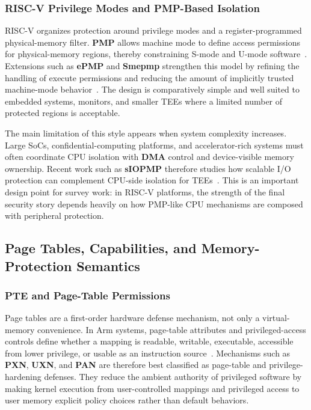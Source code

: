 \subsubsection{RISC-V Privilege Modes and PMP-Based Isolation}

RISC-V organizes protection around privilege modes and a register-programmed physical-memory filter. \textbf{PMP} allows machine mode to define access permissions for physical-memory regions, thereby constraining S-mode and U-mode software~\cite{riscv_privileged}. Extensions such as \textbf{ePMP} and \textbf{Smepmp} strengthen this model by refining the handling of execute permissions and reducing the amount of implicitly trusted machine-mode behavior~\cite{riscv_privileged}. The design is comparatively simple and well suited to embedded systems, monitors, and smaller TEEs where a limited number of protected regions is acceptable.

The main limitation of this style appears when system complexity increases. Large SoCs, confidential-computing platforms, and accelerator-rich systems must often coordinate CPU isolation with \textbf{DMA} control and device-visible memory ownership. Recent work such as \textbf{sIOPMP} therefore studies how scalable I/O protection can complement CPU-side isolation for TEEs~\cite{feng2024siopmp}. This is an important design point for survey work: in RISC-V platforms, the strength of the final security story depends heavily on how PMP-like CPU mechanisms are composed with peripheral protection.

\subsection{Page Tables, Capabilities, and Memory-Protection Semantics}

\subsubsection{PTE and Page-Table Permissions}

Page tables are a first-order hardware defense mechanism, not only a virtual-memory convenience. In Arm systems, page-table attributes and privileged-access controls define whether a mapping is readable, writable, executable, accessible from lower privilege, or usable as an instruction source~\cite{armv-a}. Mechanisms such as \textbf{PXN}, \textbf{UXN}, and \textbf{PAN} are therefore best classified as page-table and privilege-hardening defenses. They reduce the ambient authority of privileged software by making kernel execution from user-controlled mappings and privileged access to user memory explicit policy choices rather than default behaviors.

